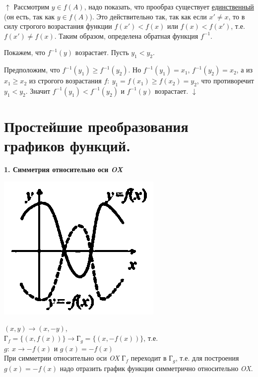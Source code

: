\documentclass{article}
\begin{document}
    $\uparrow$ Рассмотрим $y \in f(A)$, надо показать, что прообраз существует \underline{единственный} (он есть, так как $y \in f(A)$). Это действительно так, так как если $x' \neq x$, то в силу строгого возрастания функции $f(x') < f(x)$ или $f(x) < f(x')$, т.е. $f(x') \neq f(x)$. Таким образом, определена обратная функция $f^{-1}$.
    
    Покажем, что $f^{-1}(y)$ возрастает. Пусть $y_1 < y_2$.

    Предположим, что $f^{-1}(y_1) \geq f^{-1}(y_2)$. Но $f^{-1}(y_1) = x_1$, $f^{-1}(y_2) = x_2$, а из $x_1 \geq x_2$ из строгого возрастания $f:\ y_1 = f(x_1) \geq f(x_2) = y_2$, что противоречит $y_1 < y_2$. Значит $f^{-1}(y_1) < f^{-1}(y_2)$ и $f^{-1}(y)$ возрастает. $\downarrow$

    \section{Простейшие преобразования графиков функций.}

    \textbf{1. Симметрия относительно оси \textit{OX}}

    \noindent\begin{minipage}{0.3\textwidth}
        \includegraphics[scale=0.4]{4_5}
    \end{minipage}
    \hfill%
    \begin{minipage}{0.6\textwidth}\raggedright
        $(x, y) \rightarrow (x, -y)$,\\
        $\textrm{Г}_f = \{(x, f(x))\} \rightarrow \textrm{Г}_g = \{(x, -f(x))\}$, т.е.\\
        $g:\ x \rightarrow -f(x)$ и $g(x) = -f(x)$\\
        При симметрии относительно оси \textit{OX} $\textrm{Г}_f$ переходит в $\textrm{Г}_g$, т.е. для построения $g(x) = -f(x)$ надо отразить график функции симметрично относительно \textit{OX}.
    \end{minipage}
\end{document}
